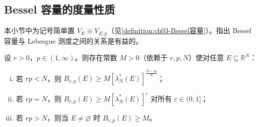 \documentclass[../../main.tex]{subfiles}%
\begin{document}
\subsection{Bessel 容量的度量性质}\label{subsection:ch03-度量性质}

本小节中为记号简单置 $V_E\equiv V_{E,p}$（见\cref{definition:ch03-Bessel容量}）。指出 Bessel 容量与 Lebesgue 测度之间的关系是有益的。

\begin{proposition}\label{proposition:ch03-点容量}
设 $r>0$，$p\in(1,\infty)$。则存在常数 $M>0$（依赖于 $r,p,N$）使对任意 $E\subseteq\mathbb{R}^N$：
\begin{enumerate}[(i)]
\item 若 $rp<N$，则 $B_{r,p}(E)\geqslant M[\lambda_N^*(E)]^{\frac{N-rp}{N}}$；
\item 若 $rp=N$，则 $B_{r,p}(E)\geqslant M[\lambda_N^*(E)]^{\varepsilon}$ 对所有 $\varepsilon\in(0,1]$；
\item 若 $rp>N$，则当 $E\neq\varnothing $ 时 $B_{r,p}(E)\geqslant M$。
\end{enumerate}
\end{proposition}
\end{document}

